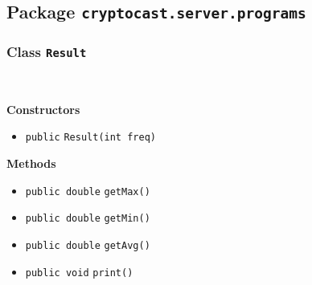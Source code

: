 \subsection{Package \lstinline!cryptocast.server.programs!}


\subsubsection{Class \lstinline|Result|}
 \\
\noindent\begin{minipage}[t]{5cm}
\vspace{0.3em}
\hspace*{2em}
\vspace{0.3em}
\end{minipage}




\textbf{\sffamily Constructors}
\begin{itemize}
\item \lstinline|public| \lstinline|Result|\lstinline|(int freq)| \\[-0.6em]




\end{itemize}


\textbf{\sffamily Methods}
\begin{itemize}
\item \lstinline|public double| \lstinline|getMax|\lstinline|()| \\[-0.6em]




\item \lstinline|public double| \lstinline|getMin|\lstinline|()| \\[-0.6em]




\item \lstinline|public double| \lstinline|getAvg|\lstinline|()| \\[-0.6em]




\item \lstinline|public void| \lstinline|print|\lstinline|()| \\[-0.6em]




\end{itemize}

